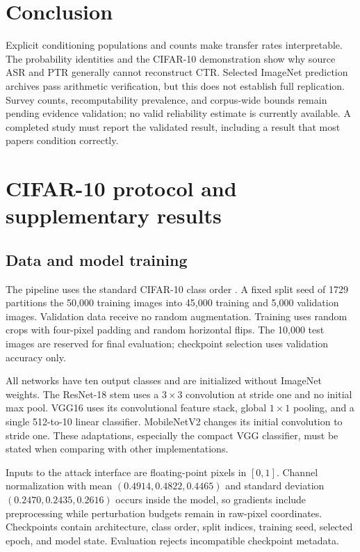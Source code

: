 \documentclass[10pt]{article}
\begin{document}
\section{Conclusion}
Explicit conditioning populations and counts make transfer rates interpretable. The probability identities and the CIFAR-10 demonstration show why source ASR and PTR generally cannot reconstruct CTR. Selected ImageNet prediction archives pass arithmetic verification, but this does not establish full replication. Survey counts, recomputability prevalence, and corpus-wide bounds remain pending evidence validation; no valid reliability estimate is currently available. A completed study must report the validated result, including a result that most papers condition correctly.

\appendix
\section{CIFAR-10 protocol and supplementary results}
\label{app:cifar}
\subsection{Data and model training}
The pipeline uses the standard CIFAR-10 class order \citep{cifar}. A fixed split seed of 1729 partitions the 50,000 training images into 45,000 training and 5,000 validation images. Validation data receive no random augmentation. Training uses random crops with four-pixel padding and random horizontal flips. The 10,000 test images are reserved for final evaluation; checkpoint selection uses validation accuracy only.

All networks have ten output classes and are initialized without ImageNet weights. The ResNet-18 stem uses a $3\times3$ convolution at stride one and no initial max pool. VGG16 uses its convolutional feature stack, global $1\times1$ pooling, and a single 512-to-10 linear classifier. MobileNetV2 changes its initial convolution to stride one. These adaptations, especially the compact VGG classifier, must be stated when comparing with other implementations.

Inputs to the attack interface are floating-point pixels in $[0,1]$. Channel normalization with mean $(0.4914,0.4822,0.4465)$ and standard deviation $(0.2470,0.2435,0.2616)$ occurs inside the model, so gradients include preprocessing while perturbation budgets remain in raw-pixel coordinates. Checkpoints contain architecture, class order, split indices, training seed, selected epoch, and model state. Evaluation rejects incompatible checkpoint metadata.
\end{document}
